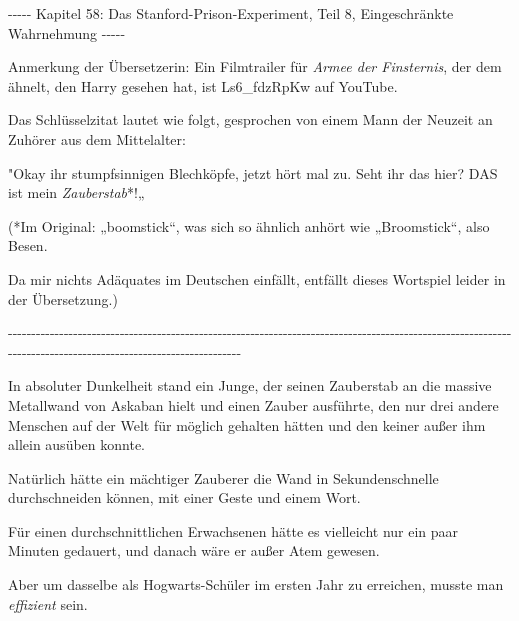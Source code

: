 

\hypertarget{das-stanford-prison-experiment-teil-8-eingeschruxe4nkte-wahrnehmung}{%

-\/-\/-\/-\/- Kapitel 58: Das Stanford-Prison-Experiment, Teil 8, Eingeschränkte Wahrnehmung -\/-\/-\/-\/-

Anmerkung der Übersetzerin: Ein Filmtrailer für \emph{Armee der Finsternis}, der dem ähnelt, den Harry gesehen hat, ist Ls6\_fdzRpKw auf YouTube.

Das Schlüsselzitat lautet wie folgt, gesprochen von einem Mann der Neuzeit an Zuhörer aus dem Mittelalter:

"Okay ihr stumpfsinnigen Blechköpfe, jetzt hört mal zu. Seht ihr das hier? DAS ist mein \emph{Zauberstab}*!„

(*Im Original: „boomstick“, was sich so ähnlich anhört wie „Broomstick“, also Besen.

Da mir nichts Adäquates im Deutschen einfällt, entfällt dieses Wortspiel leider in der Übersetzung.)

-\/-\/-\/-\/-\/-\/-\/-\/-\/-\/-\/-\/-\/-\/-\/-\/-\/-\/-\/-\/-\/-\/-\/-\/-\/-\/-\/-\/-\/-\/-\/-\/-\/-\/-\/-\/-\/-\/-\/-\/-\/-\/-\/-\/-\/-\/-\/-\/-\/-\/-\/-\/-\/-\/-\/-\/-\/-\/-\/-\/-\/-\/-\/-\/-\/-\/-\/-\/-\/-\/-\/-\/-\/-\/-\/-\/-\/-\/-\/-\/-\/-\/-\/-\/-\/-\/-\/-\/-\/-\/-\/-\/-\/-\/-\/-\/-\/-\/-\/-\/-\/-\/-\/-\/-\/-\/-\/-\/-\/-\/-\/-\/-\/-\/-\/-\/-\/-\/-\/-\/-\/-\/-\/-\/-\/-\/-\/-\/-\/-\/-\/-\/-\/-\/-\/-\/-\/-\/-\/-\/-\/-\/-\/-\/-\/-\/-\/-\/-\/-\/-\/-\/-\/-\/-\/-\/-\/-

In absoluter Dunkelheit stand ein Junge, der seinen Zauberstab an die massive Metallwand von Askaban hielt und einen Zauber ausführte, den nur drei andere Menschen auf der Welt für möglich gehalten hätten und den keiner außer ihm allein ausüben konnte.

Natürlich hätte ein mächtiger Zauberer die Wand in Sekundenschnelle durchschneiden können, mit einer Geste und einem Wort.

Für einen durchschnittlichen Erwachsenen hätte es vielleicht nur ein paar Minuten gedauert, und danach wäre er außer Atem gewesen.

Aber um dasselbe als Hogwarts-Schüler im ersten Jahr zu erreichen, musste man \emph{effizient} sein.

}
